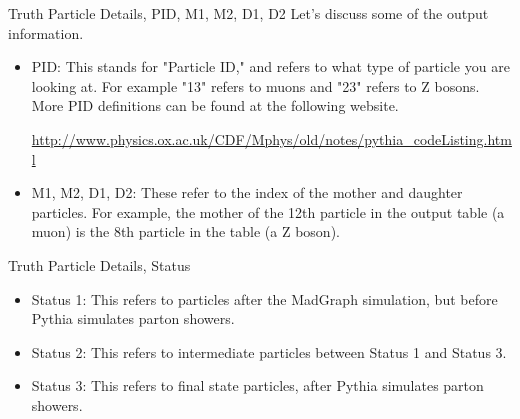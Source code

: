 \documentclass{beamer}
\begin{document}
	\begin{frame}{Truth Particle Details, PID, M1, M2, D1, D2}
Let's discuss some of the output information.

\bigskip

		\begin{itemize}
\item<1->PID: This stands for "Particle ID," and refers to what type of particle you are looking at. For example "13" refers to muons and "23" refers to Z bosons. More PID definitions can be found at the following website.

\bigskip

\url{http://www.physics.ox.ac.uk/CDF/Mphys/old/notes/pythia_codeListing.html}

\bigskip

\item<1->M1, M2, D1, D2: These refer to the index of the mother and daughter particles. For example, the mother of the 12th particle in the output table (a muon) is the 8th particle in the table (a Z boson).
		\end{itemize}

\bigskip
	\end{frame}
	\begin{frame}{Truth Particle Details, Status}

		\begin{itemize}
\item<1->Status 1: This refers to particles after the MadGraph simulation, but before Pythia simulates parton showers.
\item<1->Status 2: This refers to intermediate particles between Status 1 and Status 3.
\item<1->Status 3: This refers to final state particles, after Pythia simulates parton showers.
		\end{itemize}

\bigskip
	\end{frame}
\end{document}
